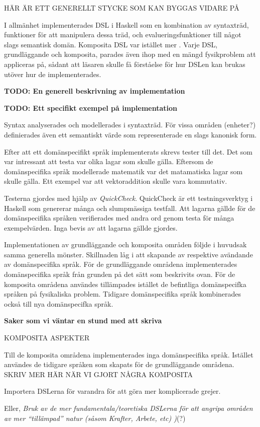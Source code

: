 \begin{binge}

HÄR ÄR ETT GENERELLT STYCKE SOM KAN BYGGAS VIDARE PÅ

I allmänhet implementerades DSL i Haskell som en kombination av syntaxträd,
funktioner för att manipulera dessa träd, och evalueringsfunktioner till något
slags semantisk domän. Komposita DSL var
istället mer . Varje DSL, grundläggande och komposita,
parades även ihop med en mängd fysikproblem att appliceras på, sådant att
läsaren skulle få förståelse för hur DSLen kan brukas utöver hur de
implementerades.

\textbf{TODO: En generell beskrivning av implementation}

\textbf{TODO: Ett specifikt exempel på implementation}

Syntax analyserades och modellerades i syntaxträd. För vissa områden
(enheter?) definierades även ett semantiskt värde som representerade
en slags kanonisk form.

\end{binge}
\begin{draft}

Efter att ett domänspecifikt språk implementerats skrevs tester till det. Det som var intressant att testa var olika lagar som skulle gälla. Eftersom de domänspecifika språk modellerade matematik var det matamatiska lagar som skulle gälla. Ett exempel var att vektoraddition skulle vara kommutativ.

Testerna gjordes med hjälp av \textit{QuickCheck}. QuickCheck är ett testningsverktyg i Haskell som genererar många och slumpmässiga testfall. Att lagarna gällde för de domänspecifika språken verifierades med andra ord genom testa för många exempelvärden. Inga bevis av att lagarna gällde gjordes.

Implementationen av grundläggande och komposita områden följde i huvudsak samma generella mönster. Skillnaden låg i att skapande av respektive avändande av domänspecifika språk. För de grundläggande områdena implementerades domänspecifika språk från grunden på det sätt som beskrivits ovan. För de komposita områdena användes tillämpades istället de befintliga domänspecifka språken på fysikaliska problem. Tidigare domänspecifika språk kombinerades också till nya domänspecifka språk.


\end{draft}
\begin{binge}

\textbf{Saker som vi väntar en stund med att skriva}

KOMPOSITA ASPEKTER

Till de komposita områdena implementerades inga domänspecifika språk. Istället användes de tidigare språken som skapats för de grundläggande områdena. SKRIV MER HÄR NÄR VI GJORT NÅGRA KOMPOSITA

Importera DSLerna för varandra för att göra mer komplicerade grejer.

Eller, \emph{Bruk av de mer fundamentala/teoretiska DSLerna för att
  angripa områden av mer ``tillämpad'' natur (såsom Krafter, Arbete,
  etc) )}(?)

\end{binge}
